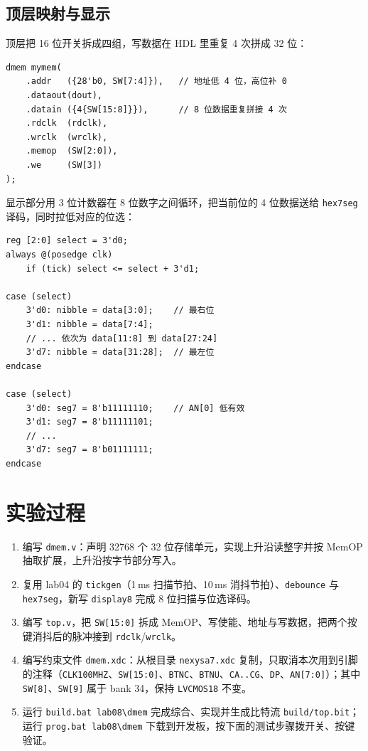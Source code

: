 \documentclass[12pt, a4paper]{ctexart}
\begin{document}
\subsection{顶层映射与显示}
顶层把 16 位开关拆成四组，写数据在 HDL 里重复 4 次拼成 32 位：

\begin{lstlisting}
dmem mymem(
    .addr   ({28'b0, SW[7:4]}),   // 地址低 4 位，高位补 0
    .dataout(dout),
    .datain ({4{SW[15:8]}}),      // 8 位数据重复拼接 4 次
    .rdclk  (rdclk),
    .wrclk  (wrclk),
    .memop  (SW[2:0]),
    .we     (SW[3])
);
\end{lstlisting}

\noindent 显示部分用 3 位计数器在 8 位数字之间循环，把当前位的 4 位数据送给 \texttt{hex7seg} 译码，同时拉低对应的位选：

\begin{lstlisting}
reg [2:0] select = 3'd0;
always @(posedge clk)
    if (tick) select <= select + 3'd1;

case (select)
    3'd0: nibble = data[3:0];    // 最右位
    3'd1: nibble = data[7:4];
    // ... 依次为 data[11:8] 到 data[27:24]
    3'd7: nibble = data[31:28];  // 最左位
endcase

case (select)
    3'd0: seg7 = 8'b11111110;    // AN[0] 低有效
    3'd1: seg7 = 8'b11111101;
    // ...
    3'd7: seg7 = 8'b01111111;
endcase
\end{lstlisting}

\section{实验过程}
\begin{enumerate}
    \item 编写 \texttt{dmem.v}：声明 32768 个 32 位存储单元，实现上升沿读整字并按 MemOP 抽取扩展，上升沿按字节部分写入。
    \item 复用 lab04 的 \texttt{tickgen}（1\,ms 扫描节拍、10\,ms 消抖节拍）、\texttt{debounce} 与 \texttt{hex7seg}，新写 \texttt{display8} 完成 8 位扫描与位选译码。
    \item 编写 \texttt{top.v}，把 \texttt{SW[15:0]} 拆成 MemOP、写使能、地址与写数据，把两个按键消抖后的脉冲接到 \texttt{rdclk}/\texttt{wrclk}。
    \item 编写约束文件 \texttt{dmem.xdc}：从根目录 \texttt{nexysa7.xdc} 复制，只取消本次用到引脚的注释（\texttt{CLK100MHZ}、\texttt{SW[15:0]}、\texttt{BTNC}、\texttt{BTNU}、\texttt{CA..CG}、\texttt{DP}、\texttt{AN[7:0]}）；其中 \texttt{SW[8]}、\texttt{SW[9]} 属于 bank 34，保持 \texttt{LVCMOS18} 不变。
    \item 运行 \texttt{build.bat lab08\textbackslash dmem} 完成综合、实现并生成比特流 \texttt{build/top.bit}；运行 \texttt{prog.bat lab08\textbackslash dmem} 下载到开发板，按下面的测试步骤拨开关、按键验证。
\end{enumerate}
\end{document}

